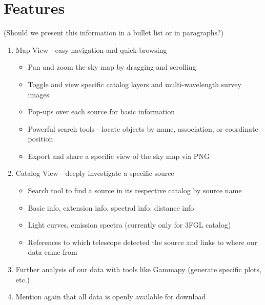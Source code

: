 \section{Features}

(Should we present this information in a bullet list or in paragraphs?)

\begin{enumerate}

\item Map View - easy navigation and quick browsing

  \begin{itemize}

  \item Pan and zoom the sky map by dragging and scrolling

  \item Toggle and view specific catalog layers and multi-wavelength survey images

  \item Pop-ups over each source for basic information

  \item Powerful search tools - locate objects by name, association, or coordinate position

  \item Export and share a specific view of the sky map via PNG

  \end{itemize}


\item Catalog View - deeply investigate a specific source

  \begin{itemize}

  \item Search tool to find a source in its respective catalog by source name

  \item Basic info, extension info, spectral info, distance info

  \item Light curves, emission spectra (currently only for 3FGL catalog)

  \item References to which telescope detected the source and links to where our data came from

  \end{itemize}


\item Further analysis of our data with tools like Gammapy (generate specific plots, etc.)

\item Mention again that all data is openly available for download

\end{enumerate}


